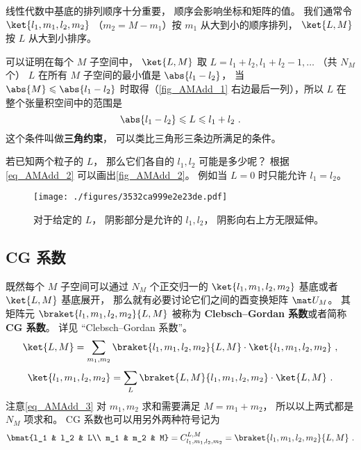 线性代数中基底的排列顺序十分重要， 顺序会影响坐标和矩阵的值。 我们通常令 $\ket{l_1, m_1, l_2, m_2}$ （$m_2 = M - m_1$）按 $m_1$ 从大到小的顺序排列， $\ket{L, M}$ 按 $L$ 从大到小排序。

可以证明在每个 $M$ 子空间中， $\ket{L, M}$ 取 $L = l_1 + l_2, l_1 + l_2 - 1,\dots$ （共 $N_M$ 个） %
$L$ 在所有 $M$ 子空间的最小值是 $\abs{l_1 - l_2}$， 当 $\abs{M} \leqslant \abs{l_1 - l_2}$ 时取得（\autoref{fig_AMAdd_1} 右边最后一列），所以 $L$ 在整个张量积空间中的范围是
\begin{equation}\label{eq_AMAdd_2}
\abs{l_1 - l_2} \leqslant L \leqslant l_1 + l_2~.
\end{equation}
这个条件叫做\textbf{三角约束}， 可以类比三角形三条边所满足的条件。

若已知两个粒子的 $L$， 那么它们各自的 $l_1, l_2$ 可能是多少呢？ 根据\autoref{eq_AMAdd_2} 可以画出\autoref{fig_AMAdd_2}。 例如当 $L = 0$ 时只能允许 $l_1 = l_2$。
\begin{figure}[ht]
\centering
\texttt{[image: ./figures/3532ca999e2e23de.pdf]}
\caption{对于给定的 $L$， 阴影部分是允许的 $l_1, l_2$， 阴影向右上方无限延伸。} \label{fig_AMAdd_2}
\end{figure}

\subsection{CG 系数}
既然每个 $M$ 子空间可以通过 $N_M$ 个正交归一的 $\ket{l_1, m_1, l_2, m_2}$ 基底或者 $\ket{L,M}$ 基底展开， 那么就有必要讨论它们之间的酉变换矩阵 $\mat U_M$。 其矩阵元 $\braket{l_1, m_1, l_2, m_2}{L, M}$ 被称为 \textbf{Clebsch–Gordan 系数}或者简称 \textbf{CG 系数}。 详见 “Clebsch–Gordan 系数”。
\begin{equation}\label{eq_AMAdd_3}
\ket{L, M} = \sum_{m_1, m_2}\braket{l_1, m_1, l_2, m_2}{L, M} \cdot \ket{l_1, m_1, l_2, m_2}~,
\end{equation}
\begin{equation}
\ket{l_1, m_1, l_2, m_2} = \sum_{L}\braket{L, M}{l_1, m_1, l_2, m_2} \cdot \ket{L, M}~.
\end{equation}
注意\autoref{eq_AMAdd_3} 对 $m_1,m_2$ 求和需要满足 $M = m_1 + m_2$， 所以以上两式都是 $N_M$ 项求和。 CG 系数也可以用另外两种符号记为
\begin{equation}
\bmat{l_1 & l_2 & L\\ m_1 & m_2 & M} = C_{l_1, m_1, l_2, m_2}^{L, M} = \braket{l_1, m_1, l_2, m_2}{L, M}~.
\end{equation}


